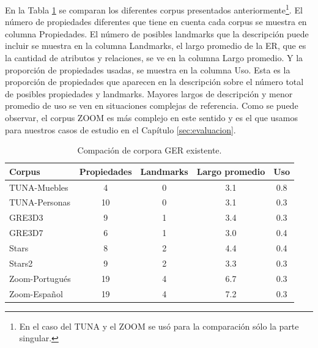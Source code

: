 En la Tabla \ref{tab-comparison-prop} se comparan los diferentes corpus presentados anteriormente\footnote{En el caso del TUNA y el ZOOM se us\'o para la comparaci\'on s\'olo la parte singular.}. El n\'umero de propiedades diferentes que tiene en cuenta cada corpus se muestra en columna Propiedades. El n\'umero de posibles landmarks que la descripci\'on puede incluir se muestra en la columna Landmarks, el largo promedio de la ER, que es la cantidad de atributos y relaciones, se ve en la columna Largo promedio. Y la proporci\'on de propiedades usadas, se muestra en la columna Uso. Esta es la proporci\'on de propiedades que aparecen en la descripci\'on sobre el n\'umero total de posibles propiedades y landmarks. Mayores largos de descripci\'on y menor promedio de uso se ven en situaciones complejas de referencia. Como se puede observar, el corpus ZOOM es m\'as complejo en este sentido y es el que usamos para nuestros casos de estudio en el Cap\'itulo \ref{sec:evaluacion}.

\begin{table}[ht]
\begin{center}
\footnotesize{

\label{tab-comparison-prop}
\begin{tabular} {  l c c c c}
\hline
Corpus											&Propiedades			  & Landmarks			& Largo promedio	& Uso \\
\hline
TUNA-Muebles							  & 4								& 0							&	3.1				& 0.8   \\
TUNA-Personas								& 10							& 0							& 3.1				& 0.3   \\
GRE3D3											&	9								& 1							& 3.4				& 0.3   \\
GRE3D7											&	6								& 1							& 3.0				& 0.4   \\
Stars												&	8								& 2							& 4.4				& 0.4   \\
Stars2											& 9								& 2							& 3.3				& 0.3   \\
Zoom-Portugu\'es						& 19							& 4							& 6.7				& 0.3   \\
Zoom-Espa\~nol							& 19							& 4							& 7.2				& 0.3   \\
\hline
\end{tabular}
}
\end{center}
\caption{Compaci\'on de corpora GER existente.}
\end{table}

